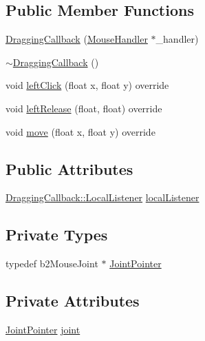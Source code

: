 \subsection*{Public Member Functions}
\begin{DoxyCompactItemize}
\item 
\hyperlink{classDraggingCallback_a9ea246a89d494379fd518cf544694674}{Dragging\+Callback} (\hyperlink{classMouseHandler}{Mouse\+Handler} $\ast$\+\_\+handler)
\item 
\hyperlink{classDraggingCallback_a47830632e5c0894a2883af00817d58dc}{$\sim$\+Dragging\+Callback} ()
\item 
void \hyperlink{classDraggingCallback_a20b673ac127fd52f7bf8453467930cf5}{left\+Click} (float x, float y) override
\item 
void \hyperlink{classDraggingCallback_a33ea59d939d8e3fa366e595628e8ac4f}{left\+Release} (float, float) override
\item 
void \hyperlink{classDraggingCallback_a8d1541c9219f67864ab64279b53d3ad4}{move} (float x, float y) override
\end{DoxyCompactItemize}
\subsection*{Public Attributes}
\begin{DoxyCompactItemize}
\item 
\hyperlink{classDraggingCallback_1_1LocalListener}{Dragging\+Callback\+::\+Local\+Listener} \hyperlink{classDraggingCallback_a65aaf71fa563b3976df8407611cbfd39}{local\+Listener}
\end{DoxyCompactItemize}
\subsection*{Private Types}
\begin{DoxyCompactItemize}
\item 
typedef b2\+Mouse\+Joint $\ast$ \hyperlink{classDraggingCallback_a1570d13a473c79f56bc5ae72c5a1ac92}{Joint\+Pointer}
\end{DoxyCompactItemize}
\subsection*{Private Attributes}
\begin{DoxyCompactItemize}
\item 
\hyperlink{classDraggingCallback_a1570d13a473c79f56bc5ae72c5a1ac92}{Joint\+Pointer} \hyperlink{classDraggingCallback_abd56ea5d5ec74d7dee10133a19478b8c}{joint}
\end{DoxyCompactItemize}
